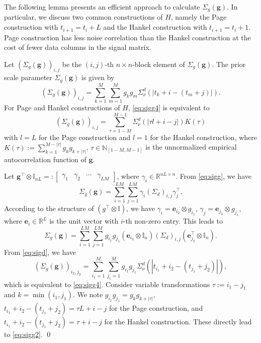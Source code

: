 \documentclass{ifacconf}
\begin{document}
The following lemma presents an efficient approach to calculate $\Sigma_g(\mathbf{g})$. In particular, we discuss two common constructions of $H$, namely the Page construction \citep{DAMEN1982202} with $t_{i+1}=t_i+L$ and the Hankel construction \citep{van2012subspace} with $t_{i+1}=t_i+1$. Page construction has less noise correlation than the Hankel construction at the cost of fewer data columns in the signal matrix.
\begin{lem}
    Let $\left(\Sigma_g(\mathbf{g})\right)_{i,j}$ be the $(i,j)$-th $n\times n$-block element of $\Sigma_g(\mathbf{g})$. The prior scale parameter $\Sigma_g(\mathbf{g})$ is given by
    \begin{equation}
    \left(\Sigma_g(\mathbf{g})\right)_{i,j}=\sum_{k=1}^M\sum_{m=1}^M g_{k}g_{m}\Sigma_\nu^d(|t_k+i-(t_m+j)|).
    \label{eq:sigg4}
    \end{equation}
    For Page and Hankel constructions of $H$, \eqref{eq:sigg4} is equivalent to
    \begin{equation}
        \left(\Sigma_g(\mathbf{g})\right)_{i,j}=\sum_{\tau=1-M}^{M-1}\Sigma_\nu^d(|\tau l+i-j|)K(\tau)
    \label{eq:sigg2}
    \end{equation}
    with $l=L$ for the Page construction and $l=1$ for the Hankel construction,
    where $K(\tau):=\sum_{k=1}^{M-|\tau|}g_k g_{k+|\tau|}$, $\tau\in\mathbb{N}_{[1-M,M-1]}$ is the unnormalized empirical autocorrelation function of $\mathbf{g}$.
\end{lem}
\begin{pf}
Let $\mathbf{g}^\top\otimes \mathbb{I}_{nL}=:\begin{bmatrix}
    \gamma_1&\gamma_2&\cdots&\gamma_{LM}
\end{bmatrix}$, where $\gamma_i\in\mathbb{R}^{nL\times n}$. From \eqref{eq:sigg}, we have
\begin{equation*}
\Sigma_g(\mathbf{g})=\sum_{i=1}^{LM}\sum_{j=1}^{LM}\gamma_i\left(\Sigma_d\right)_{i,j}\gamma_j^\top.
\end{equation*}
According to the structure of $\left(g^\top\otimes \mathbb{I}\right)$, we have $\gamma_i=\mathbf{e}_{i_2}\otimes g_{i_1}$, $\gamma_j=\mathbf{e}_{j_2}\otimes g_{j_1}$, where $\mathbf{e}_i\in \mathbb{R}^L$ is the unit vector with $i$-th non-zero entry. This leads to
\begin{equation*}
\Sigma_g(\mathbf{g})=\sum_{i=1}^{LM}\sum_{j=1}^{LM}g_{i_1}g_{j_1}\left(\mathbf{e}_{i_2}\otimes\mathbb{I}_n\right)\left(\Sigma_d\right)_{i,j}\left(\mathbf{e}_{j_2}^\top\otimes \mathbb{I}_n\right).
\end{equation*}
From \eqref{eq:sigd}, we have
\begin{equation*}
\left(\Sigma_g(\mathbf{g})\right)_{i_2,j_2}=\sum_{i_1=1}^M\sum_{j_1=1}^M g_{i_1}g_{j_1}\Sigma_\nu^d(|t_{i_1}+i_2-(t_{j_1}+j_2)|),
\end{equation*}
which is equivalent to \eqref{eq:sigg4}. Consider variable transformations $\tau:=i_1-j_1$ and $k=\min\left(i_1,j_1\right)$. We note $g_{i_1}g_{j_1}=g_k g_{k+|\tau|}$, $t_{i_1}+i_2-(t_{j_1}+j_2)=\tau L+i-j$ for the Page construction, and $t_{i_1}+i_2-(t_{j_1}+j_2)=\tau+i-j$ for the Hankel construction. These directly lead to \eqref{eq:sigg2}. \qed
\end{pf}
\end{document}
